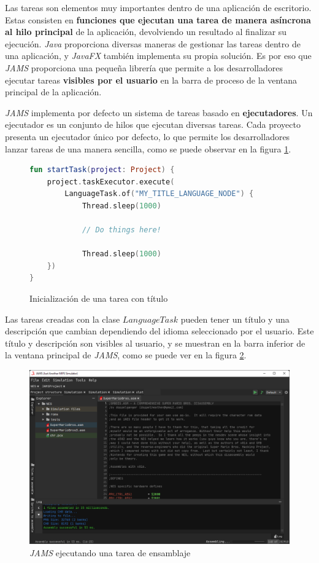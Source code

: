 Las tareas son elementos muy importantes dentro de una aplicación
de escritorio.
Estas consisten en \textbf{funciones que ejecutan una tarea de manera
asíncrona al hilo principal} de la aplicación, devolviendo un
resultado al finalizar su ejecución.
\textit{Java} proporciona diversas maneras de gestionar
las tareas dentro de una aplicación, y \textit{JavaFX}
también implementa su propia solución.
Es por eso que \textit{JAMS} proporciona una pequeña
librería que permite a los desarrolladores ejecutar
tareas \textbf{visibles por el usuario} en la barra
de proceso de la ventana principal de la aplicación.

 \textit{JAMS} implementa por defecto un
sistema de tareas basado en \textbf{ejecutadores}.
Un ejecutador es un conjunto de hilos que ejecutan
diversas tareas.
Cada proyecto presenta un ejecutador único por defecto,
lo que permite los desarrolladores lanzar tareas de una
manera sencilla, como se puede observar en la figura \ref{fig:tasks-execution}.

\begin{figure}[h]
    \centering
    \begin{lstlisting}[frame=single,label={lst:tasks-execution},language=Kotlin]
fun startTask(project: Project) {
    project.taskExecutor.execute(
        LanguageTask.of("MY_TITLE_LANGUAGE_NODE") {
            Thread.sleep(1000)

            // Do things here!

            Thread.sleep(1000)
    })
}
    \end{lstlisting}
    \caption{Inicialización de una tarea con título}
    \label{fig:tasks-execution}
\end{figure}

 Las tareas creadas con la clase $LanguageTask$
pueden tener un título y una descripción que cambian dependiendo
del idioma seleccionado por el usuario.
Este título y descripción son visibles al usuario, y se muestran
en la barra inferior de la ventana principal de \textit{JAMS},
como se puede ver en la figura
\ref{fig:jams-assembling}.

\begin{figure}[h]
    \centering
    \includegraphics[width=\textwidth]{images/tecnologias/jams-assembling}
    \caption{\textit{JAMS} ejecutando una tarea de ensamblaje}
    \label{fig:jams-assembling}
\end{figure}
